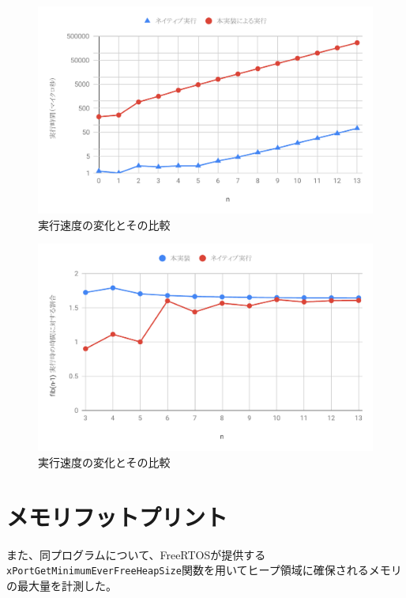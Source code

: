 \begin{figure}[htbp]
  \caption{実行速度の変化とその比較}
  \label{fig:fib_time}
  \begin{center}
    \includegraphics[bb=0 0 600 370,width=12cm]{img/fib_time.pdf}
  \end{center}
\end{figure}

\begin{figure}[htbp]
  \caption{実行速度の変化とその比較}
  \label{fig:fib_time_diff}
  \begin{center}
    \includegraphics[bb=0 0 600 370,width=12cm]{img/fib_time_diff.pdf}
  \end{center}
\end{figure}

\section{メモリフットプリント}

また、同プログラムについて、FreeRTOSが提供する\verb|xPortGetMinimumEverFreeHeapSize|関数を用いてヒープ領域に確保されるメモリの最大量を計測した。

